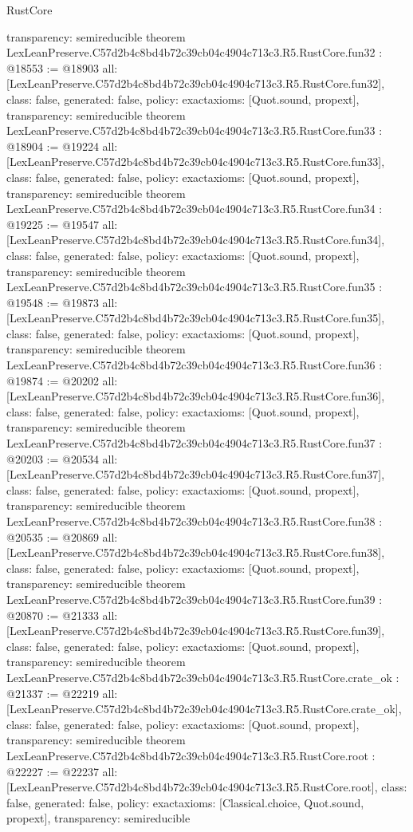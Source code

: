 \begin{lexlean}{RustCore}
\begin{coremodule}
{  transparency: semireducible
}
theorem LexLeanPreserve.C57d2b4c8bd4b72c39cb04c4904c713c3.R5.RustCore.fun32 : @18553 := @18903 {
  all: [LexLeanPreserve.C57d2b4c8bd4b72c39cb04c4904c713c3.R5.RustCore.fun32],
  class: false,
  generated: false,
  policy: exact{axioms: [Quot.sound, propext]},
  transparency: semireducible
}
theorem LexLeanPreserve.C57d2b4c8bd4b72c39cb04c4904c713c3.R5.RustCore.fun33 : @18904 := @19224 {
  all: [LexLeanPreserve.C57d2b4c8bd4b72c39cb04c4904c713c3.R5.RustCore.fun33],
  class: false,
  generated: false,
  policy: exact{axioms: [Quot.sound, propext]},
  transparency: semireducible
}
theorem LexLeanPreserve.C57d2b4c8bd4b72c39cb04c4904c713c3.R5.RustCore.fun34 : @19225 := @19547 {
  all: [LexLeanPreserve.C57d2b4c8bd4b72c39cb04c4904c713c3.R5.RustCore.fun34],
  class: false,
  generated: false,
  policy: exact{axioms: [Quot.sound, propext]},
  transparency: semireducible
}
theorem LexLeanPreserve.C57d2b4c8bd4b72c39cb04c4904c713c3.R5.RustCore.fun35 : @19548 := @19873 {
  all: [LexLeanPreserve.C57d2b4c8bd4b72c39cb04c4904c713c3.R5.RustCore.fun35],
  class: false,
  generated: false,
  policy: exact{axioms: [Quot.sound, propext]},
  transparency: semireducible
}
theorem LexLeanPreserve.C57d2b4c8bd4b72c39cb04c4904c713c3.R5.RustCore.fun36 : @19874 := @20202 {
  all: [LexLeanPreserve.C57d2b4c8bd4b72c39cb04c4904c713c3.R5.RustCore.fun36],
  class: false,
  generated: false,
  policy: exact{axioms: [Quot.sound, propext]},
  transparency: semireducible
}
theorem LexLeanPreserve.C57d2b4c8bd4b72c39cb04c4904c713c3.R5.RustCore.fun37 : @20203 := @20534 {
  all: [LexLeanPreserve.C57d2b4c8bd4b72c39cb04c4904c713c3.R5.RustCore.fun37],
  class: false,
  generated: false,
  policy: exact{axioms: [Quot.sound, propext]},
  transparency: semireducible
}
theorem LexLeanPreserve.C57d2b4c8bd4b72c39cb04c4904c713c3.R5.RustCore.fun38 : @20535 := @20869 {
  all: [LexLeanPreserve.C57d2b4c8bd4b72c39cb04c4904c713c3.R5.RustCore.fun38],
  class: false,
  generated: false,
  policy: exact{axioms: [Quot.sound, propext]},
  transparency: semireducible
}
theorem LexLeanPreserve.C57d2b4c8bd4b72c39cb04c4904c713c3.R5.RustCore.fun39 : @20870 := @21333 {
  all: [LexLeanPreserve.C57d2b4c8bd4b72c39cb04c4904c713c3.R5.RustCore.fun39],
  class: false,
  generated: false,
  policy: exact{axioms: [Quot.sound, propext]},
  transparency: semireducible
}
theorem LexLeanPreserve.C57d2b4c8bd4b72c39cb04c4904c713c3.R5.RustCore.crate_ok : @21337 := @22219 {
  all: [LexLeanPreserve.C57d2b4c8bd4b72c39cb04c4904c713c3.R5.RustCore.crate_ok],
  class: false,
  generated: false,
  policy: exact{axioms: [Quot.sound, propext]},
  transparency: semireducible
}
theorem LexLeanPreserve.C57d2b4c8bd4b72c39cb04c4904c713c3.R5.RustCore.root : @22227 := @22237 {
  all: [LexLeanPreserve.C57d2b4c8bd4b72c39cb04c4904c713c3.R5.RustCore.root],
  class: false,
  generated: false,
  policy: exact{axioms: [Classical.choice, Quot.sound, propext]},
  transparency: semireducible
}


\end{coremodule}
\end{lexlean}
